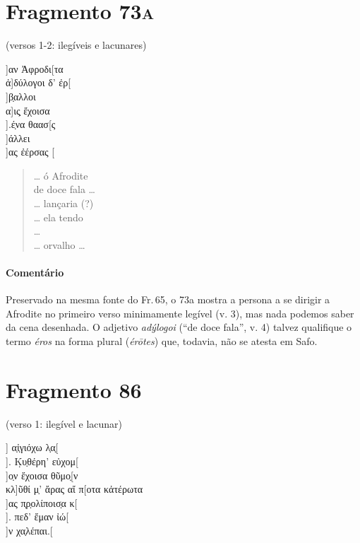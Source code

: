 \pagebreak

\section{Fragmento 73\textsc{a}} 

\begin{gkverse}
\textnormal{(versos 1-2: ilegíveis e lacunares)}

]αν Ἀφροδι[τα\\
          ἀ]δύλογοι δ’ ἐρ[\\
        ]β̣αλλοι\\
      α]ις̣ ἔχοισα\\
     ].έ̣να θαασ[ς\\
     ]άλλει\\
     ]ας ἐέρσας [

\end{gkverse}

\begin{verse}
\ldots{} ó Afrodite\\
de doce fala \ldots{}\\
\ldots{} lançaria (?)\\
\ldots{} ela tendo\\
\ldots{}\\
\ldots{} orvalho \ldots{}\\
\end{verse}

{\paragraph{Comentário} Preservado na mesma fonte do Fr.\,65, o 73a mostra a persona a se dirigir a Afrodite no primeiro verso minimamente legível (v. 3), mas nada podemos saber da cena desenhada. O adjetivo \textit{adýlogoi} (``de doce fala'', v. 4) talvez qualifique o termo \textit{éros} na forma plural (\textit{érōtes}) que, todavia, não se atesta em Safo.}

\pagebreak

\section{Fragmento 86}

\begin{gkverse}
\textnormal{(verso 1: ilegível e lacunar)}

] α̣ἰ̣γιόχω λ̣α̣[\\
]. Κ̣υ̣θέρη’ εὐχομ[\\
  ]ο̣ν ἔχοισα θῦμο̣[ν\\
κλ]ῦθί μ̣’ ἄρας αἴ π[οτα κἀτέρωτα\\
    ]ας π̣ρ̣ολίποισ̣α κ[\\
    ]. πεδ’ ἔμαν ἰώ[\\
        ]ν χα̣λέπαι.[

\end{gkverse}

